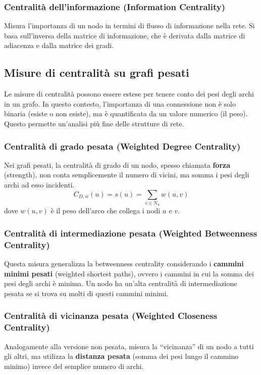 \subsubsection{Centralità dell'informazione (Information Centrality)}
Misura l'importanza di un nodo in termini di flusso di informazione nella
rete. Si basa sull'inversa della matrice di informazione, che è derivata dalla
matrice di adiacenza e dalla matrice dei gradi.

\subsection{Misure di centralità su grafi pesati}

Le misure di centralità possono essere estese per tenere conto dei pesi
degli archi in un grafo. In questo contesto, l'importanza di una connessione
non è solo binaria (esiste o non esiste), ma è quantificata da un valore
numerico (il peso). Questo permette un'analisi più fine delle strutture di rete.

\subsubsection{Centralità di grado pesata (Weighted Degree Centrality)}
Nei grafi pesati, la centralità di grado di un nodo, spesso chiamata
\textbf{forza} (strength), non conta semplicemente il numero di vicini,
ma somma i pesi degli archi ad esso incidenti.
\[
C_{D,w}(u) = s(u) = \sum_{v \in N_u} w(u,v)
\]
dove $w(u,v)$ è il peso dell'arco che collega i nodi $u$ e $v$.

\subsubsection{Centralità di intermediazione pesata (Weighted Betweenness Centrality)}
Questa misura generalizza la betweenness centrality considerando i
\textbf{cammini minimi pesati} (weighted shortest paths), ovvero i cammini
in cui la somma dei pesi degli archi è minima. Un nodo ha un'alta centralità
di intermediazione pesata se si trova su molti di questi cammini minimi.

\subsubsection{Centralità di vicinanza pesata (Weighted Closeness Centrality)}
Analogamente alla versione non pesata, misura la ``vicinanza'' di un nodo a
tutti gli altri, ma utilizza la \textbf{distanza pesata} (somma dei pesi
lungo il cammino minimo) invece del semplice numero di archi.

